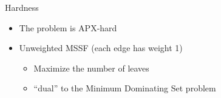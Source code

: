 \begin{frame}{Hardness}
\begin{itemize}
	\item<1> The problem is APX-hard
	\item<2-4> Unweighted MSSF (each edge has weight 1)
	\begin{itemize}
	  \item<3> Maximize the number of leaves 
	  \item<4> ``dual'' to the Minimum Dominating Set problem
	\end{itemize}
\end{itemize}

\vfill

\centering


\end{frame}